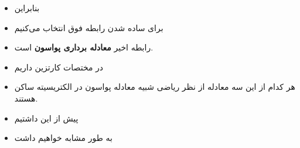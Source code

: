 \begin{ELunit}
\begin{itemize}
\tightlist
\item
  بنابراین
\end{itemize}


\begin{itemize}
\tightlist
\item
  برای ساده شدن رابطه فوق انتخاب می‌کنیم
\end{itemize}


\begin{itemize}
\tightlist
\item
  رابطه اخیر \textbf{معادله برداری پواسون} است.
\item
  در مختصات کارتزین داریم
\end{itemize}


\begin{itemize}
\tightlist
\item
  هر کدام از این سه معادله از نظر ریاضی شبیه معادله پواسون در الکتریسیته ساکن هستند.
\item
  پیش از این داشتیم
\end{itemize}


\end{ELunit}

\begin{ELjoin}

\begin{itemize}
\tightlist
\item
  به طور مشابه خواهیم داشت
\end{itemize}

\begin{ELimportant}{}


\end{ELimportant}

\end{ELjoin}

